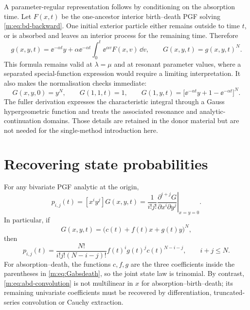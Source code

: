 A parameter-regular representation follows by conditioning on the absorption time.
Let $F(x,t)$ be the one-ancestor interior birth--death PGF solving
\cref{m:eq:bd-backward}.  One initial exterior particle either remains outside to
time $t$, or is absorbed and leaves an interior process for the remaining time.
Therefore
\begin{equation}
  g(x,y,t)=\ee^{-\alpha t}y
  +\alpha\ee^{-\alpha t}\int_0^t\ee^{\alpha v}F(x,v)\,\dd v,
  \qquad
  G(x,y,t)=g(x,y,t)^N.
  \label{m:eq:abd-convolution}
\end{equation}
This formula remains valid at $\lambda=\mu$ and at resonant parameter values, where
a separated special-function expression would require a limiting interpretation.
It also makes the normalisation checks immediate:
\[
  G(x,y,0)=y^N,
  \qquad G(1,1,t)=1,
  \qquad
  G(1,y,t)=\bigl[\ee^{-\alpha t}y+1-\ee^{-\alpha t}\bigr]^N.
\]
The fuller derivation expresses the characteristic integral through a Gauss
hypergeometric function and treats the associated resonance and
analytic-continuation domains.  Those details are retained in the donor material
but are not needed for the single-method introduction here.

\section{Recovering state probabilities}\label{m:app:coefficient-extraction}

For any bivariate PGF analytic at the origin,
\begin{equation}
  p_{i,j}(t)=[x^iy^j]G(x,y,t)
  =\frac{1}{i!j!}
  \left.
  \frac{\partial^{i+j}G}{\partial x^i\partial y^j}
  \right|_{x=y=0}.
  \label{m:eq:bivariate-coefficient}
\end{equation}
In particular, if
\[
  G(x,y,t)=\bigl(c(t)+f(t)x+g(t)y\bigr)^N,
\]
then
\begin{equation}
  p_{i,j}(t)=
  \frac{N!}{i!j!(N-i-j)!}
  f(t)^i g(t)^j c(t)^{N-i-j},
  \qquad i+j\leq N.
  \label{m:eq:trinomial-extraction}
\end{equation}
For absorption--death, the functions $c,f,g$ are the three coefficients inside the
parentheses in \cref{m:eq:Gabsdeath}, so the joint state law is trinomial.  By
contrast, \cref{m:eq:abd-convolution} is not multilinear in $x$ for
absorption--birth--death; its remaining univariate coefficients must be recovered
by differentiation, truncated-series convolution or Cauchy extraction.

\FloatBarrier
